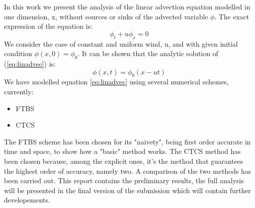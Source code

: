 
In this work we present the analysis of the linear advection equation modelled in one dimension, x, without sources or sinks of the advected variable $\phi$. The exact expression of the equation is:
\begin{equation}
\phi_{t}+u\phi_{x}=0
\label{eq:linadvec}
\end{equation}
We consider the case of constant and uniform wind, u, and with given initial condition $\phi(x,0)=\phi_{0}$.
It can be shown that the analytic solution of (\ref{eq:linadvec}) is:
\begin{equation} \label{eq:linadvec_initcondition}
\phi(x,t)=\phi_{0}(x-ut)
\end{equation}
We have modelled equation \eqref{eq:linadvec} using several numerical schemes, currently:
\begin{itemize}
	\item FTBS
	\item CTCS
\end{itemize}
The FTBS scheme has been chosen for its "naivety", being first order accurate in time and space, to show how a "basic" method works.
The CTCS method has been chosen because, among the explicit ones, it's the method that guarantees the highest order of accuracy, namely two. A comparison of the two methods has been carried out.
This report contains the preliminary results, the full analysis will be presented in the final version of the submission which will contain further developements.